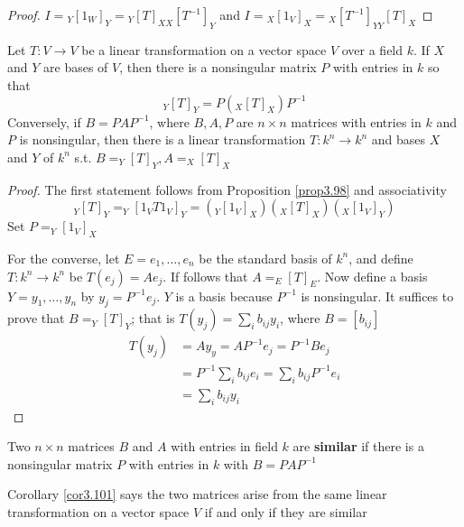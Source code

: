 \documentclass[11pt]{article}
\begin{document}
\begin{proof}
\(I={}_Y[1_W]_Y={}_Y[T]_{XX}[T^{-1}]_Y\) and \(I={}_X[1_V]_X={}_X[T^{-1}]_{YY}[T]_X\)
\end{proof}

\begin{corollary}[]
\label{cor3.101}
Let \(T:V\to V\) be a linear transformation on a vector space \(V\) over a
field \(k\). If \(X\) and \(Y\) are bases of \(V\), then there is a nonsingular
matrix \(P\) with entries in \(k\) so that
\begin{equation*}
{}_Y[T]_Y=P(_X[T]_X)P^{-1}
\end{equation*}
Conversely, if \(B=PAP^{-1}\), where \(B,A,P\) are \(n\times n\) matrices
with entries in \(k\) and \(P\) is nonsingular, then there is a linear
transformation \(T:k^n\to k^n\) and bases \(X\) and \(Y\) of \(k^n\) s.t.
\(B=_Y[T]_Y,A=_X[T]_X\)
\end{corollary}

\begin{proof}
The first statement follows from Proposition \ref{prop3.98} and associativity
\begin{equation*}
{}_Y[T]_Y=_Y[1_VT1_V]_Y=(_Y[1_V]_X)(_X[T]_X)(_X[1_V]_Y)
\end{equation*}
Set \(P=_Y[1_V]_X\)

For the converse, let \(E=e_1,\dots,e_n\) be the standard basis of \(k^n\),
and define \(T:k^n\to k^n\) be \(T(e_j)=Ae_j\). If follows that
\(A=_E[T]_E\). Now define a basis \(Y=y_1,\dots,y_n\) by \(y_j=P^{-1}e_j\).
\(Y\) is a basis because \(P^{-1}\) is nonsingular. It suffices to prove that 
\(B=_Y[T]_Y\); that is \(T(y_j)=\sum_ib_{ij}y_i\), where \(B=[b_{ij}]\)
\begin{align*}
T(y_j)&=Ay_y=AP^{-1}e_j=P^{-1}Be_j\\
&=P^{-1}\displaystyle\sum_{i}b_{ij}e_i
=\displaystyle\sum_{i}b_{ij}P^{-1}e_i\\
&=\displaystyle\sum_{i}b_{ij}y_i
\end{align*}
\end{proof}

\begin{definition}[]
Two \(n\times n\) matrices \(B\)  and \(A\) with entries in field \(k\) are
\textbf{similar} if there is a nonsingular matrix \(P\) with entries in \(k\) with
\(B=PAP^{-1}\) 
\end{definition}



Corollary \ref{cor3.101} says the two matrices arise from the same linear
transformation on a vector space \(V\) if and only if they are similar
\end{document}
